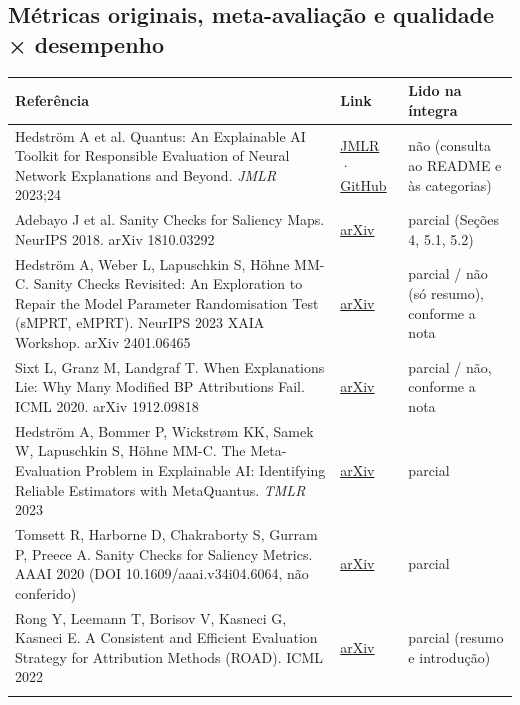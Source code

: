 \documentclass[11pt,a4paper]{article}
\begin{document}
\subsection{Métricas originais, meta-avaliação e qualidade × desempenho}

{\scriptsize\setlength{\tabcolsep}{3pt}
\begin{xltabular}{\linewidth}{>{\raggedright\arraybackslash}X>{\raggedright\arraybackslash}X>{\raggedright\arraybackslash}X}
\toprule
\textbf{Referência} & \textbf{Link} & \textbf{Lido na íntegra} \\
\midrule
\endhead
Hedström A et al. Quantus: An Explainable AI Toolkit for Responsible Evaluation of Neural Network Explanations and Beyond. \textit{JMLR} 2023;24 & \href{https://www.jmlr.org/papers/volume24/22-0142/22-0142.pdf}{JMLR} · \href{https://github.com/understandable-machine-intelligence-lab/Quantus}{GitHub} & não (consulta ao README e às categorias) \\ \addlinespace[1pt]
Adebayo J et al. Sanity Checks for Saliency Maps. NeurIPS 2018. arXiv 1810.03292 & \href{https://arxiv.org/abs/1810.03292}{arXiv} & parcial (Seções 4, 5.1, 5.2) \\ \addlinespace[1pt]
Hedström A, Weber L, Lapuschkin S, Höhne MM-C. Sanity Checks Revisited: An Exploration to Repair the Model Parameter Randomisation Test (sMPRT, eMPRT). NeurIPS 2023 XAIA Workshop. arXiv 2401.06465 & \href{https://arxiv.org/abs/2401.06465}{arXiv} & parcial / não (só resumo), conforme a nota \\ \addlinespace[1pt]
Sixt L, Granz M, Landgraf T. When Explanations Lie: Why Many Modified BP Attributions Fail. ICML 2020. arXiv 1912.09818 & \href{https://arxiv.org/abs/1912.09818}{arXiv} & parcial / não, conforme a nota \\ \addlinespace[1pt]
Hedström A, Bommer P, Wickstrøm KK, Samek W, Lapuschkin S, Höhne MM-C. The Meta-Evaluation Problem in Explainable AI: Identifying Reliable Estimators with MetaQuantus. \textit{TMLR} 2023 & \href{https://arxiv.org/abs/2302.07265}{arXiv} & parcial \\ \addlinespace[1pt]
Tomsett R, Harborne D, Chakraborty S, Gurram P, Preece A. Sanity Checks for Saliency Metrics. AAAI 2020 (DOI 10.1609/aaai.v34i04.6064, não conferido) & \href{https://arxiv.org/abs/1912.01451}{arXiv} & parcial \\ \addlinespace[1pt]
Rong Y, Leemann T, Borisov V, Kasneci G, Kasneci E. A Consistent and Efficient Evaluation Strategy for Attribution Methods (ROAD). ICML 2022 & \href{https://arxiv.org/abs/2202.00449}{arXiv} & parcial (resumo e introdução) \\ \addlinespace[1pt]

\end{xltabular}}
\end{document}
